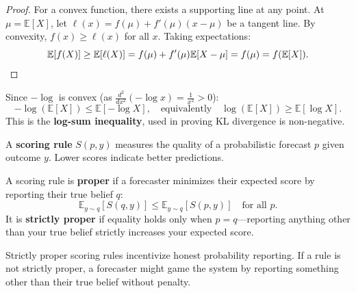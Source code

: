 \begin{proof}
    For a convex function, there exists a supporting line at any point. At $\mu = \mathbb{E}[X]$, let $\ell(x) = f(\mu) + f'(\mu)(x - \mu)$ be a tangent line. By convexity, $f(x) \geq \ell(x)$ for all $x$. Taking expectations:
    \[
        \mathbb{E}[f(X)] \geq \mathbb{E}[\ell(X)] = f(\mu) + f'(\mu)\mathbb{E}[X - \mu] = f(\mu) = f(\mathbb{E}[X]). \qedhere
    \]
\end{proof}

\begin{example}
    Since $-\log$ is convex (as $\frac{d^2}{dx^2}(-\log x) = \frac{1}{x^2} > 0$):
    \[
        -\log(\mathbb{E}[X]) \leq \mathbb{E}[-\log X], \quad \text{equivalently} \quad \log(\mathbb{E}[X]) \geq \mathbb{E}[\log X].
    \]
    This is the \textbf{log-sum inequality}, used in proving KL divergence is non-negative.
\end{example}

\begin{definition}
    A \textbf{scoring rule} $S(p, y)$ measures the quality of a probabilistic forecast $p$ given outcome $y$. Lower scores indicate better predictions.

    A scoring rule is \textbf{proper} if a forecaster minimizes their expected score by reporting their true belief $q$:
    \[
        \mathbb{E}_{y \sim q}[S(q, y)] \leq \mathbb{E}_{y \sim q}[S(p, y)] \quad \text{for all } p.
    \]
    It is \textbf{strictly proper} if equality holds only when $p = q$---reporting anything other than your true belief strictly increases your expected score.
\end{definition}

\begin{remark}
    Strictly proper scoring rules incentivize honest probability reporting. If a rule is not strictly proper, a forecaster might game the system by reporting something other than their true belief without penalty.
\end{remark}

